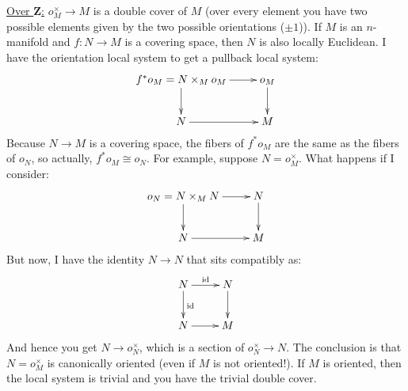 \documentclass{amsart}
\theoremstyle{theorem}
\theoremstyle{definition}
\newcommand{\Z}{\mathbf Z}
\begin{document}
\underline{Over $\Z$:} $o_M^\times\to M$ is a double cover of $M$ (over every element you have two possible elements given by the two possible orientations ($\pm 1$)). If $M$ is an $n$-manifold and $f:N\to M$ is a covering space, then $N$ is also locally Euclidean. I have the orientation local system to get a pullback local system:
\begin{equation*}
\xymatrix{
	f^\ast o_M=N\times_M o_M\ar[r]\ar[d] & o_M\ar[d]\\
	N\ar[r] & M
}
\end{equation*}
Because $N\to M$ is a covering space, the fibers of $f^\ast o_M$ are the same as the fibers of $o_N$, so actually, $f^\ast o_M\cong o_N$. For example, suppose $N=o_M^\times$. What happens if I consider:
\begin{equation*}
\xymatrix{
	o_N=N\times_M N\ar[r]\ar[d] & N\ar[d]\\
	N\ar[r] & M
}
\end{equation*}
But now, I have the identity $N\to N$ that sits compatibly as:
\begin{equation*}
\xymatrix{
	N\ar[r]^{\mathrm{id}}\ar[d] ^{\mathrm{id}} & N\ar[d]\\
	N\ar[r] & M
}
\end{equation*}
And hence you get $N\to o_N^\times$, which is a section of $o_N^\times\to N$. The conclusion is that $N=o_M^\times$ is canonically oriented (even if $M$ is not oriented!). If $M$ is oriented, then the local system is trivial and you have the trivial double cover.
\end{document}
